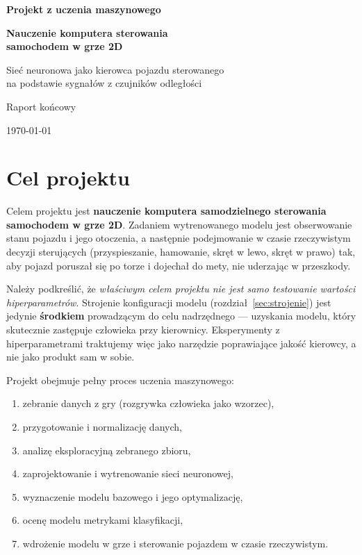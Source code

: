 \documentclass[11pt,a4paper]{article}
\begin{document}
\begin{titlepage}
\centering
\vspace*{2cm}
{\Large\bfseries Projekt z uczenia maszynowego\par}
\vspace{1.5cm}
{\Huge\bfseries Nauczenie komputera sterowania\\[0.3cm] samochodem w grze 2D\par}
\vspace{0.8cm}
{\large Sieć neuronowa jako kierowca pojazdu sterowanego\\ na podstawie sygnałów z czujników odległości\par}
\vspace{2.5cm}
{\large Raport końcowy\par}
\vfill
{\large \today\par}
\end{titlepage}

\tableofcontents
\newpage

\section{Cel projektu}
\label{sec:cel}

Celem projektu jest \textbf{nauczenie komputera samodzielnego sterowania samochodem
w grze 2D}. Zadaniem wytrenowanego modelu jest obserwowanie stanu pojazdu i jego
otoczenia, a następnie podejmowanie w czasie rzeczywistym decyzji sterujących
(przyspieszanie, hamowanie, skręt w lewo, skręt w prawo) tak, aby pojazd poruszał
się po torze i dojechał do mety, nie uderzając w przeszkody.

Należy podkreślić, że \emph{właściwym celem projektu nie jest samo testowanie
wartości hiperparametrów}. Strojenie konfiguracji modelu (rozdział~\ref{sec:strojenie})
jest jedynie \textbf{środkiem} prowadzącym do celu nadrzędnego --- uzyskania modelu,
który skutecznie zastępuje człowieka przy kierownicy. Eksperymenty z hiperparametrami
traktujemy więc jako narzędzie poprawiające jakość kierowcy, a nie jako produkt sam
w sobie.

Projekt obejmuje pełny proces uczenia maszynowego:
\begin{enumerate}[noitemsep]
  \item zebranie danych z gry (rozgrywka człowieka jako wzorzec),
  \item przygotowanie i normalizację danych,
  \item analizę eksploracyjną zebranego zbioru,
  \item zaprojektowanie i wytrenowanie sieci neuronowej,
  \item wyznaczenie modelu bazowego i jego optymalizację,
  \item ocenę modelu metrykami klasyfikacji,
  \item wdrożenie modelu w grze i sterowanie pojazdem w czasie rzeczywistym.
\end{enumerate}
\end{document}
